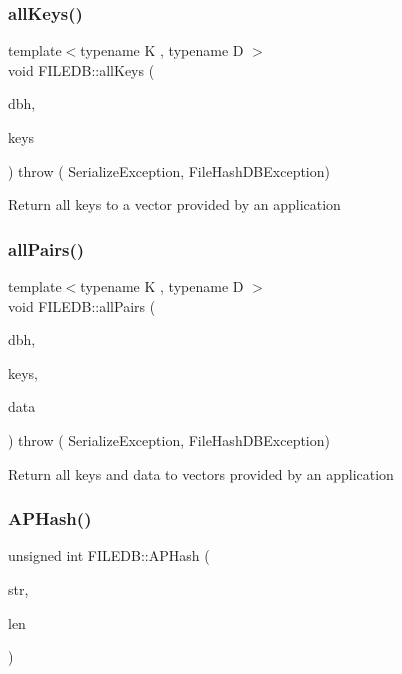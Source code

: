 \subsubsection{\texorpdfstring{allKeys()}{allKeys()}}
{\footnotesize\ttfamily template$<$typename K , typename D $>$ \\
void F\+I\+L\+E\+D\+B\+::all\+Keys (\begin{DoxyParamCaption}\item[{\mbox{\hyperlink{other__libs_2filedb_2filehash_2ffdb__db_8h_a0b27b956926453a7a8141ea8e10f0df8}{F\+F\+D\+B\+\_\+\+DB}} $\ast$}]{dbh,  }\item[{std\+::vector$<$ K $>$ \&}]{keys }\end{DoxyParamCaption}) throw ( Serialize\+Exception, File\+Hash\+D\+B\+Exception) }

Return all keys to a vector provided by an application \mbox{\label{namespaceFILEDB_a94222bc861d65f1c5f139529a5643cd4}} 
\subsubsection{\texorpdfstring{allPairs()}{allPairs()}}
{\footnotesize\ttfamily template$<$typename K , typename D $>$ \\
void F\+I\+L\+E\+D\+B\+::all\+Pairs (\begin{DoxyParamCaption}\item[{\mbox{\hyperlink{other__libs_2filedb_2filehash_2ffdb__db_8h_a0b27b956926453a7a8141ea8e10f0df8}{F\+F\+D\+B\+\_\+\+DB}} $\ast$}]{dbh,  }\item[{std\+::vector$<$ K $>$ \&}]{keys,  }\item[{std\+::vector$<$ D $>$ \&}]{data }\end{DoxyParamCaption}) throw ( Serialize\+Exception, File\+Hash\+D\+B\+Exception) }

Return all keys and data to vectors provided by an application \mbox{\label{namespaceFILEDB_a23c71972866e86f222ad440284380f45}} 
\subsubsection{\texorpdfstring{APHash()}{APHash()}}
{\footnotesize\ttfamily unsigned int F\+I\+L\+E\+D\+B\+::\+A\+P\+Hash (\begin{DoxyParamCaption}\item[{char $\ast$}]{str,  }\item[{unsigned int}]{len }\end{DoxyParamCaption})}

